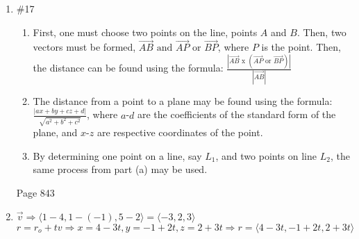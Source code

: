 \documentclass[12pt]{article}
\begin{document}
\begin{enumerate}
\begin{enumerate}
    \end{enumerate}

  \item \#17 \begin{enumerate}

      \item First, one must choose two points on the line, points $A$ and $B$. Then, two vectors must be formed, $\overrightarrow{AB} \text{ and } \overrightarrow{AP} \text{ or } \overrightarrow{BP}$, where $P$ is the point. Then, the distance can be found using the formula: $\frac{|\overrightarrow{AB}\text{ x }(\overrightarrow{AP} \text{ or } \overrightarrow{BP})|}{|\overrightarrow{AB}|}$  

      \item The distance from a point to a plane may be found using the formula: $\frac{|ax+by+cz+d|}{\sqrt{a^2+b^2+c^2}}$, where $a$-$d$ are the coefficients of the standard form of the plane, and $x$-$z$ are respective coordinates of the point.

      \item By determining one point on a line, say $L_1$, and two points on line $L_2$, the same process from part (a) may be used.

    \end{enumerate}

    \begin{center}

Page 843

    \end{center}

  \item $\overrightarrow{v}\Longrightarrow\langle1-4,1-(-1),5-2\rangle=\langle-3, 2, 3\rangle$ \\ $r=r_o+tv \Longrightarrow x=4-3t, y=-1+2t, z=2+3t \Longrightarrow r = \langle 4-3t, -1+2t, 2+3t\rangle$

\end{enumerate}
\end{document}

